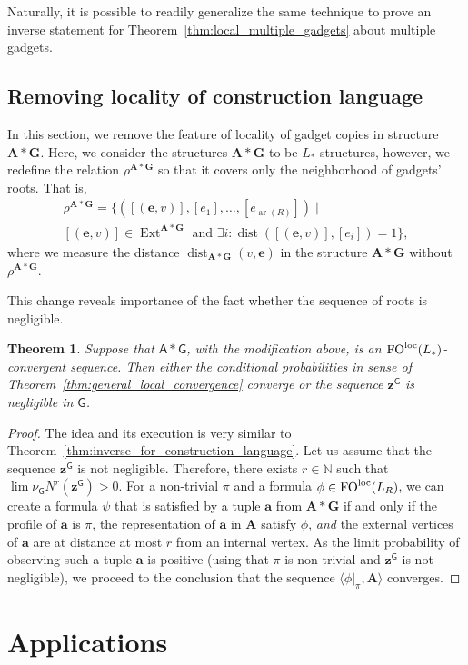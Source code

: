 \documentclass[11pt]{article}
\theoremstyle{plain}
\newtheorem{theorem}{Theorem}[section]
\theoremstyle{definition}
\theoremstyle{remark}
\DeclareMathOperator\dist{dist}
\DeclareMathOperator\aritysym{ar}
\newcommand{\arity}[1]{{\aritysym({#1})}}
\newcommand{\N}{\mathbb{N}}
\DeclareMathOperator\FO{FO}
\newcommand{\FOloc}[1]{\FO_{#1}^\textnormal{loc}}
\newcommand{\stonepar}[2]{\langle #1, #2 \rangle}
\newcommand{\str}[1]{\mathbf{#1}}
\newcommand{\strseq}[1]{{\boldsymbol{\mathsf{#1}}}}
\newcommand{\tpl}[1]{{\bm{#1}}}
\DeclareMathOperator\Ext{Ext}
\begin{document}
Naturally, it is possible to readily generalize the same technique to prove an inverse statement for Theorem~\ref{thm:local_multiple_gadgets} about multiple gadgets.

\subsection{Removing locality of construction language}\label{ssec:omitting_locality_of_construction_language}

In this section, we remove the feature of locality of gadget copies in structure $\str{A}*\str{G}$.
Here, we consider the structures $\str{A}*\str{G}$ to be $L_*$-structures, however, we redefine the relation $\rho^{\str{A}*\str{G}}$ so that it covers only the neighborhood of gadgets' roots.
That is,
\begin{multline*}
    \rho^{\str{A}*\str{G}} = \big\{([(\tpl{e}, v)], [e_1], \dots, [e_\arity{R}]) \;\big|\;
    \\
    [(\tpl{e}, v)] \in \Ext^{\str{A}*\str{G}} \text{ and } \exists i : \dist([(\tpl{e}, v)], [e_i]) = 1\big\}
    ,
\end{multline*}
where we measure the distance $\dist_{\str{A}*\str{G}}(v, \tpl{e})$ in the structure $\str{A}*\str{G}$ without $\rho^{\str{A}*\str{G}}$.

This change reveals importance of the fact whether the sequence of roots is negligible.

\begin{theorem}\label{thm:inverse_for_construction_language_without_locality}
    Suppose that $\strseq{A}*\strseq{G}$, with the modification above, is an $\FOloc{}(L_*)$-convergent sequence.
    Then either the conditional probabilities in sense of Theorem~\ref{thm:general_local_convergence} converge or the sequence $\tpl{z}^\strseq{G}$ is negligible in $\strseq{G}$.
\end{theorem}
\begin{proof}
    The idea and its execution is very similar to Theorem~\ref{thm:inverse_for_construction_language}.
    Let us assume that the sequence $\tpl{z}^\strseq{G}$ is not negligible.
    Therefore, there exists $r \in \N$ such that $\lim \nu_\strseq{G} N^r(\tpl{z}^{\strseq{G}}) > 0$.
    For a non-trivial $\pi$ and a formula $\phi \in \FOloc{}(L_R)$, we can create a formula $\psi$ that is satisfied by a tuple $\tpl{a}$ from $\str{A}*\str{G}$ if and only if the profile of $\tpl{a}$ is $\pi$, the representation of $\tpl{a}$ in $\str{A}$ satisfy $\phi$, \emph{and} the external vertices of $\tpl{a}$ are at distance at most $r$ from an internal vertex.
    As the limit probability of observing such a tuple $\tpl{a}$ is positive (using that $\pi$ is non-trivial and $\tpl{z}^{\strseq{G}}$ is not negligible), we proceed to the conclusion that the sequence $\stonepar{\phi|_\pi}{\str{A}}$ converges.
\end{proof} \section{Applications}\label{sec:applications}
\end{document}
